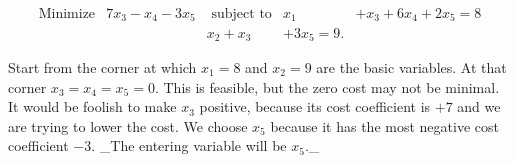 \[\begin{array}{ccc}\text{Minimize}&7x_{3}-x_{4}-3x_{5}&\text{ subject to}&x_{1}&+x_{3}+6x_{4}+2x_{5}=8\\ &&x_{2}+x_{3}&+3x_{5}=9.\end{array}\]

Start from the corner at which \(x_{1}=8\) and \(x_{2}=9\) are the basic variables. At that corner \(x_{3}=x_{4}=x_{5}=0\). This is feasible, but the zero cost may not be minimal. It would be foolish to make \(x_{3}\) positive, because its cost coefficient is \(+7\) and we are trying to lower the cost. We choose \(x_{5}\) because it has the most negative cost coefficient \(-3\). _The entering variable will be \(x_{5}\)._
